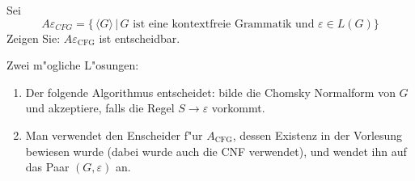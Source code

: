 Sei
\[
A\varepsilon_{CFG}=\{
\,\langle G\rangle\,|\,\text{$G$ ist eine kontextfreie Grammatik und $\varepsilon\in L(G)$}
\}
\]
Zeigen Sie: $A\varepsilon_{\text{CFG}}$ ist entscheidbar.

\begin{loesung}
Zwei m"ogliche L"osungen:
\begin{enumerate}
\item
Der folgende Algorithmus entscheidet: bilde die Chomsky Normalform von $G$
und akzeptiere, falls die Regel $S\to\varepsilon$ vorkommt.
\item
Man verwendet den Enscheider f"ur $A_{\text{CFG}}$, dessen
Existenz in der Vorlesung bewiesen wurde (dabei wurde auch die CNF
verwendet), und wendet ihn auf das Paar $(G,\varepsilon)$ an.
\qedhere
\end{enumerate}
\end{loesung}
